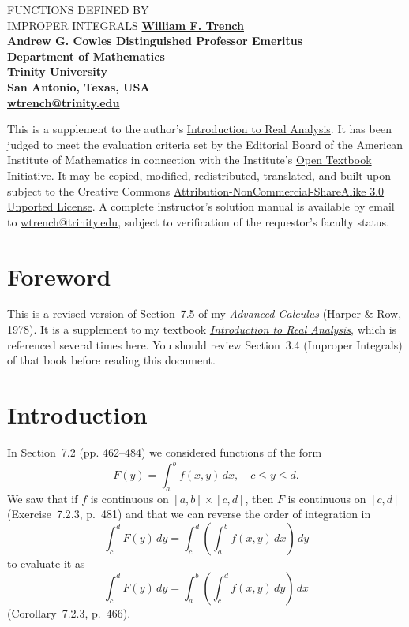 \documentclass{article}
\begin{document}
\thispagestyle{empty}
\bf
\begin{center}
{\Huge FUNCTIONS DEFINED BY\\ \medskip IMPROPER INTEGRALS}
\vspace{.5in}
\huge
\bigskip
\vspace{.75in}
\bf\huge
\href{http://ramanujan.math.trinity.edu/wtrench/index.shtml}
{William F. Trench}
\medskip
\\\large
Andrew G. Cowles Distinguished Professor Emeritus\\
Department of Mathematics\\
Trinity University \\
San Antonio, Texas, USA\\
\href{mailto:{wtrench@trinity.edu}}
{wtrench@trinity.edu}
\large
\vspace*{.75in}
\end{center}


\rm
\noindent
This is a supplement to the author's
\href{http://ramanujan.math.trinity.edu/wtrench/texts/TRENCH_REAL_ANALYSIS.PDF}
{\large Introduction to Real Analysis}.
It   has been judged to meet the evaluation criteria set by the
Editorial  Board
of the American Institute of Mathematics in connection with the Institute's
\href{http://www.aimath.org/textbooks/}
{Open
Textbook Initiative}.
It may be copied, modified, redistributed, translated,  and
built upon  subject to the Creative
Commons
      \href{http://creativecommons.org/licenses/by-nc-sa/3.0/deed.en_G}
{Attribution-NonCommercial-ShareAlike 3.0 Unported License}.
A complete instructor's solution manual is available by email to
\href{mailto:wtrench@trinity.edu}
{wtrench@trinity.edu},
 subject to verification of the requestor's
faculty status.



\newpage
\rm
\section{Foreword} \label{section:foreword}
This is a revised version of Section~7.5 of my \emph{Advanced Calculus}
(Harper \& Row, 1978).
It is a supplement to my textbook
\href{http://ramanujan.math.trinity.edu/wtrench/texts/TRENCH_REAL_ANALYSIS.PDF}
{\emph{Introduction to Real Analysis}}, which
is referenced several times here.
You
should review   Section~3.4  (Improper Integrals) of that book before
reading this document.

\section{Introduction}\label{section:introduction}
  In  Section~7.2 (pp. 462--484)
we considered functions of the form
$$
F(y)=\int_{a}^{b}f(x,y)\,dx, \quad c \le y \le d.
$$
We saw   that if $f$  is continuous on
$[a,b]\times
[c,d]$,  then
$F$  is continuous on $[c,d]$ (Exercise~7.2.3, p.~481) and that
we can reverse the order of integration  in
$$
\int_{c}^{d}F(y)\,dy=\int_{c}^{d}\left(\int_{a}^{b}f(x,y)\,dx\right)\,dy
$$
to evaluate it as
$$
\int_{c}^{d}F(y)\,dy=\int_{a}^{b}\left(\int_{c}^{d}f(x,y)\,dy\right)\,dx
$$
(Corollary~7.2.3, p.~466).
\end{document}
